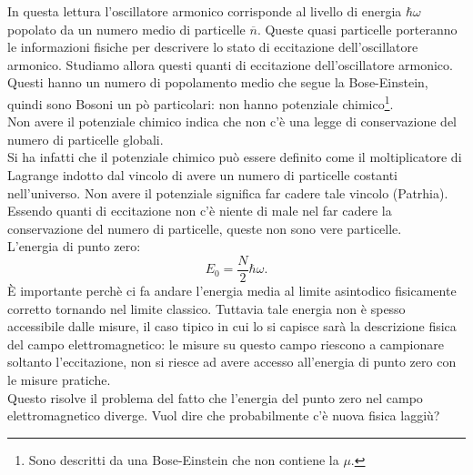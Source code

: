 In questa lettura l'oscillatore armonico corrisponde al livello di energia $\hbar\omega $ popolato da un numero medio di particelle $\overline{n}$. Queste quasi particelle porteranno le informazioni fisiche per descrivere lo stato di eccitazione dell'oscillatore armonico. Studiamo allora questi quanti di eccitazione dell'oscillatore armonico.\\
Questi hanno un numero di popolamento medio che segue la Bose-Einstein, quindi sono Bosoni un pò particolari: non hanno potenziale chimico\footnote{Sono descritti da una Bose-Einstein che non contiene la $\mu $.}.\\
Non avere il potenziale chimico indica che non c'è una legge di conservazione del numero di particelle globali.\\
Si ha infatti che il potenziale chimico può essere definito come il moltiplicatore di Lagrange indotto dal vincolo di avere un numero di particelle costanti nell'universo. Non avere il potenziale significa far cadere tale vincolo (Patrhia).\\ 
Essendo quanti di eccitazione non c'è niente di male nel far cadere la conservazione del numero di particelle, queste non sono vere particelle.\\
L'energia di punto zero:
\[
	E_0 = \frac{N}{2}\hbar\omega 
.\] 
È importante perchè ci fa andare l'energia media al limite asintodico fisicamente corretto tornando nel limite classico. 
Tuttavia tale energia non è spesso accessibile dalle misure, il caso tipico in cui lo si capisce sarà la descrizione fisica del campo elettromagnetico: le misure su questo campo riescono a campionare soltanto l'eccitazione, non si riesce ad avere accesso all'energia di punto zero con le misure pratiche.\\
Questo risolve il problema del fatto che l'energia del punto zero nel campo elettromagnetico diverge. Vuol dire che probabilmente c'è nuova fisica laggiù?

